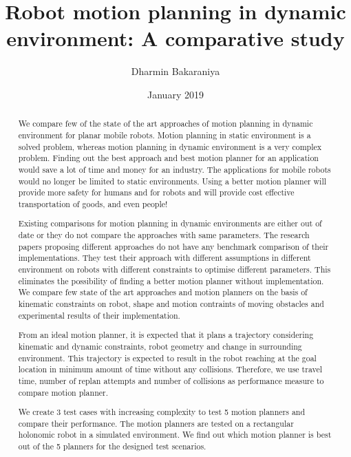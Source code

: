 \documentclass[rnd]{mas_report}
\author{Dharmin Bakaraniya}
\title{Robot motion planning in dynamic environment: A comparative study}
\date{January 2019}
\begin{document}
\begin{titlepage}
    \maketitle
\end{titlepage}


\pagestyle{plain}


\cleardoublepage{}
\statementpage{}

\begin{abstract}

We compare few of the state of the art approaches of motion planning in dynamic environment for
planar mobile robots.
Motion planning in static environment is a solved problem, whereas motion
planning in dynamic environment is a very complex problem. Finding out the best approach and best 
motion planner for an application would save a lot of time and money for an industry. The applications
for mobile robots would no longer be limited to static environments. Using a better motion planner will 
provide more safety for humans and for robots and will provide cost effective transportation of goods,
and even people!

Existing comparisons for motion planning in dynamic environments are either out of date or they do 
not compare the approaches with same parameters. The research papers proposing different approaches
do not have any benchmark comparison of their implementations. They test their approach with different 
assumptions in different environment on robots with different constraints to optimise different 
parameters. This eliminates the possibility of finding a better motion planner without implementation.
We compare few state of the art approaches
and motion planners on the basis of kinematic constraints on robot, shape and motion contraints of 
moving obstacles and experimental results of their implementation.

From an ideal motion planner, it is 
expected that it plans a trajectory considering kinematic and dynamic constraints, robot geometry and
change in surrounding environment. This trajectory is expected to result in the robot reaching 
at the goal location in minimum amount of time without any collisions. Therefore, we use travel time, number of
replan attempts and number of collisions as performance measure to compare motion planner.

We create 3 test cases with increasing complexity to test 5 motion planners and compare their performance.
The motion planners are tested on a rectangular holonomic robot in a simulated environment. We find
out which motion planner is best out of the 5 planners for the designed test scenarios.

\end{abstract}
\end{document}

